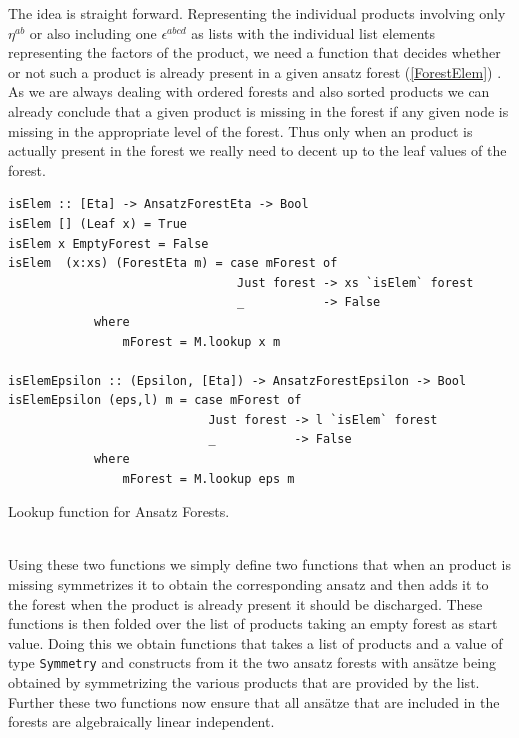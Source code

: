 \documentclass[a4paper,12pt, DIV=14, BCOR=5mm, twoside, headsepline, numbers=noenddot]{scrbook}
\begin{document}
The idea is straight forward. Representing the individual products involving only $\eta^{ab}$ or also including one $\epsilon^{abcd}$ as lists with the individual list elements representing the factors of the product, we need a function that decides whether or not such a product is already present in a given ansatz forest (\ref{ForestElem}) . As we are always dealing with ordered forests and also sorted products we can already conclude that a given product is missing in the forest if any given node is missing in the appropriate level of the forest. Thus only when an product is actually present in the forest we really need to decent up to the leaf values of the forest.
\begin{listing}[hbt!]
\begin{verbatim}
isElem :: [Eta] -> AnsatzForestEta -> Bool
isElem [] (Leaf x) = True
isElem x EmptyForest = False
isElem  (x:xs) (ForestEta m) = case mForest of
                                Just forest -> xs `isElem` forest
                                _           -> False
            where
                mForest = M.lookup x m

isElemEpsilon :: (Epsilon, [Eta]) -> AnsatzForestEpsilon -> Bool
isElemEpsilon (eps,l) m = case mForest of
                            Just forest -> l `isElem` forest
                            _           -> False
            where
                mForest = M.lookup eps m  
\end{verbatim} 
\caption{Lookup function for Ansatz Forests.}\label{ForestElem}
\end{listing}\\

Using these two functions we simply define two functions that when an product is missing symmetrizes it to obtain the corresponding ansatz and then adds it to the forest when the product is already present it should be discharged. These functions is then folded over the list of products taking an empty forest as start value.  Doing this we obtain functions that takes a list of products and a value of type \texttt{Symmetry} and constructs from it the two ansatz forests with ansätze being obtained by symmetrizing the various products that are provided by the list. Further these two functions now ensure that all ansätze that are included in the forests are algebraically linear independent. \\
\end{document}
